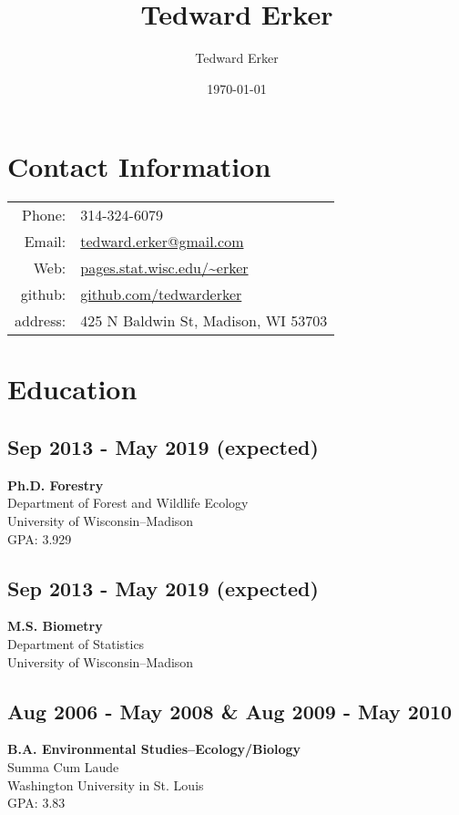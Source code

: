 \documentclass{article}
\author{Tedward Erker}
\date{\today}
\title{Tedward Erker}
\begin{document}
\maketitle
\section*{Contact Information}
\label{sec:orgb474c8a}
\begin{center}
\begin{tabular}{rp{}}
Phone: & 314-324-6079\\
Email: & \href{mailto:erker@wisc.edu}{tedward.erker@gmail.com}\\
Web: & \href{http://pages.stat.wisc.edu/\~erker/}{pages.stat.wisc.edu/\textasciitilde{}erker}\\
github: & \href{https://github.com/tedwarderker}{github.com/tedwarderker}\\
address: & 425 N Baldwin St, Madison, WI 53703\\
\end{tabular}
\end{center}

\section*{Education}
\label{sec:org7cdbfdb}
\subsection*{Sep 2013 - May 2019 (expected)}
\label{sec:org1a3d08e}
\textbf{Ph.D. Forestry} \\
Department of Forest and Wildlife Ecology \\
University of Wisconsin--Madison \\
GPA: 3.929

\subsection*{Sep 2013 - May 2019 (expected)}
\label{sec:org619f602}
\textbf{M.S. Biometry} \\
Department of Statistics \\
University of Wisconsin--Madison

\subsection*{Aug 2006 - May 2008 \& Aug 2009 - May 2010}
\label{sec:orgcabfc98}
\textbf{B.A. Environmental Studies--Ecology/Biology} \\
Summa Cum Laude \\
Washington University in St. Louis \\
GPA: 3.83
\end{document}
